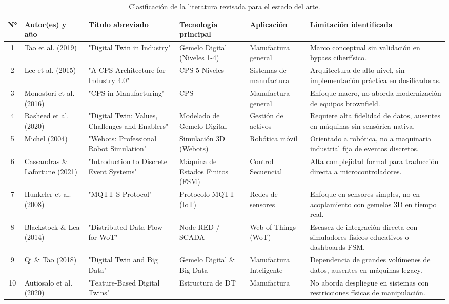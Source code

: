\begin{table}[htbp]
  \centering
  \caption{Clasificación de la literatura revisada para el estado del arte.}
  \label{tab:estado_arte}
  \footnotesize
  \begin{tabular}{|c|p{2.2cm}|p{2.8cm}|p{2cm}|p{2.2cm}|p{2.2cm}|}
    \hline
    \textbf{N°} & \textbf{Autor(es) y año} & \textbf{Título abreviado} & \textbf{Tecnología principal} & \textbf{Aplicación} & \textbf{Limitación identificada} \\
    \hline
    1 & Tao et al. (2019) & "Digital Twin in Industry" \cite{tao2019} & Gemelo Digital (Niveles 1-4) & Manufactura general & Marco conceptual sin validación en bypass ciberfísico. \\ 
    \hline
    2 & Lee et al. (2015) & "A CPS Architecture for Industry 4.0" \cite{lee2015} & CPS 5 Niveles & Sistemas de manufactura & Arquitectura de alto nivel, sin implementación práctica en dosificadoras. \\
    \hline
    3 & Monostori et al. (2016) & "CPS in Manufacturing" \cite{monostori2016} & CPS & Manufactura general & Enfoque macro, no aborda modernización de equipos brownfield. \\
    \hline
    4 & Rasheed et al. (2020) & "Digital Twin: Values, Challenges and Enablers" \cite{rasheed2020} & Modelado de Gemelo Digital & Gestión de activos & Requiere alta fidelidad de datos, ausentes en máquinas sin sensórica nativa. \\
    \hline
    5 & Michel (2004) & "Webots: Professional Robot Simulation" \cite{michel2004} & Simulación 3D (Webots) & Robótica móvil & Orientado a robótica, no a maquinaria industrial fija de eventos discretos. \\
    \hline
    6 & Cassandras \& Lafortune (2021) & "Introduction to Discrete Event Systems" \cite{cassandras2021} & Máquina de Estados Finitos (FSM) & Control Secuencial & Alta complejidad formal para traducción directa a microcontroladores. \\
    \hline
    7 & Hunkeler et al. (2008) & "MQTT-S Protocol" \cite{hunkeler2008} & Protocolo MQTT (IoT) & Redes de sensores & Enfoque en sensores simples, no en acoplamiento con gemelos 3D en tiempo real. \\
    \hline
    8 & Blackstock \& Lea (2014) & "Distributed Data Flow for WoT" \cite{blackstock2014} & Node-RED / SCADA & Web of Things (WoT) & Escasez de integración directa con simuladores físicos educativos o dashboards FSM. \\
    \hline
    9 & Qi \& Tao (2018) & "Digital Twin and Big Data" \cite{qi2018} & Gemelo Digital \& Big Data & Manufactura Inteligente & Dependencia de grandes volúmenes de datos, ausentes en máquinas legacy. \\
    \hline
    10 & Autiosalo et al. (2020) & "Feature-Based Digital Twins" \cite{autiosalo2020} & Estructura de DT & Manufactura & No aborda despliegue en sistemas con restricciones físicas de manipulación. \\
    \hline
  \end{tabular}
\end{table}

